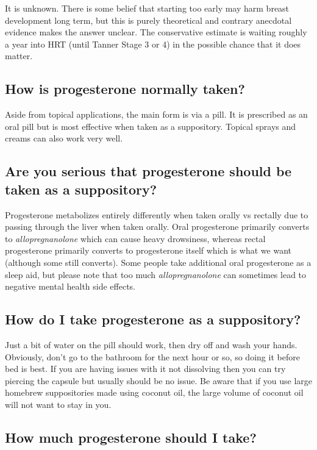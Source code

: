 \documentclass{article}
\begin{document}
{{It is unknown. There is some belief that starting too early may harm breast development long term, but this is purely theoretical and contrary anecdotal evidence makes the answer unclear. The conservative estimate is waiting roughly a year into HRT (until Tanner Stage 3 or 4) in the possible chance that it does matter.

\subsection{How is progesterone normally taken?}

Aside from topical applications, the main form is via a pill. It is prescribed as an oral pill but is most effective when taken as a suppository. Topical sprays and creams can also work very well.

\subsection{Are you serious that progesterone should be taken as a suppository?}

Progesterone metabolizes entirely differently when taken orally vs rectally due to passing through the liver when taken orally. Oral progesterone primarily converts to \textit{allopregnanolone} which can cause heavy drowsiness, whereas rectal progesterone primarily converts to progesterone itself which is what we want (although some still converts). Some people take additional oral progesterone as a sleep aid, but please note that too much \textit{allopregnanolone }can sometimes lead to negative mental health side effects.

\subsection{How do I take progesterone as a suppository?}

Just a bit of water on the pill should work, then dry off and wash your hands. Obviously, don’t go to the bathroom for the next hour or so, so doing it before bed is best. If you are having issues with it not dissolving then you can try piercing the capsule but usually should be no issue. Be aware that if you use large homebrew suppositories made using coconut oil, the large volume of coconut oil will not want to stay in you.

\subsection{How much progesterone should I take?}

}}
\end{document}
